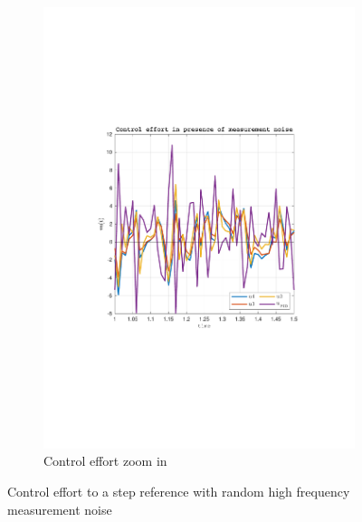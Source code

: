 \documentclass[a4paper, 12pt]{article}
\begin{document}
\begin{figure}[h!]
\begin{subfigure}[t]{0.4\textwidth}
           \includegraphics[width=\textwidth]{Figures/fig10b.pdf}
           \caption{Control effort zoom in}
           \label{fig:fig10b}
       \end{subfigure}
       \caption{Control effort to a step reference with random high frequency measurement noise}
    \label{fig:fig10}
   \end{figure}
\clearpage
\end{document}
